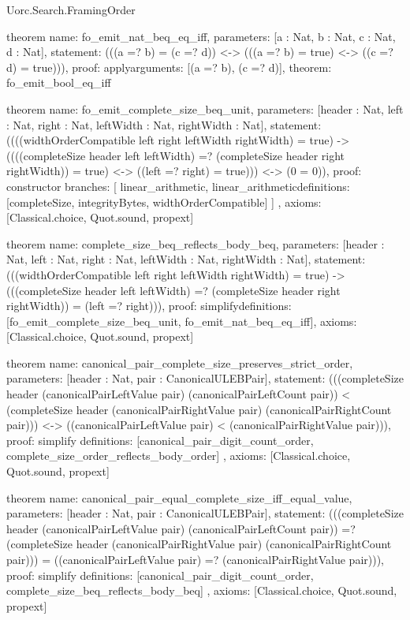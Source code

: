 \begin{lexlean}{Uorc.Search.FramingOrder}
\begin{semanticmodule}
theorem{
  name: fo_emit_nat_beq_eq_iff,
  parameters: [a : Nat, b : Nat, c : Nat, d : Nat],
  statement: (((a =? b) = (c =? d)) <-> (((a =? b) = true) <-> ((c =? d) = true))),
  proof: apply{arguments: [(a =? b), (c =? d)], theorem: fo_emit_bool_eq_iff}
}

theorem{
  name: fo_emit_complete_size_beq_unit,
  parameters: [header : Nat, left : Nat, right : Nat, leftWidth : Nat, rightWidth : Nat],
  statement: ((((widthOrderCompatible left right leftWidth rightWidth) = true) -> ((((completeSize header left leftWidth) =? (completeSize header right rightWidth)) = true) <-> ((left =? right) = true))) <-> (0 = 0)),
  proof: constructor{
    branches: [
      linear_arithmetic{},
      linear_arithmetic{definitions: [completeSize, integrityBytes, widthOrderCompatible]}
    ]
  },
  axioms: [Classical.choice, Quot.sound, propext]
}

theorem{
  name: complete_size_beq_reflects_body_beq,
  parameters: [header : Nat, left : Nat, right : Nat, leftWidth : Nat, rightWidth : Nat],
  statement: (((widthOrderCompatible left right leftWidth rightWidth) = true) -> (((completeSize header left leftWidth) =? (completeSize header right rightWidth)) = (left =? right))),
  proof: simplify{definitions: [fo_emit_complete_size_beq_unit, fo_emit_nat_beq_eq_iff]},
  axioms: [Classical.choice, Quot.sound, propext]
}

theorem{
  name: canonical_pair_complete_size_preserves_strict_order,
  parameters: [header : Nat, pair : CanonicalULEBPair],
  statement: (((completeSize header (canonicalPairLeftValue pair) (canonicalPairLeftCount pair)) < (completeSize header (canonicalPairRightValue pair) (canonicalPairRightCount pair))) <-> ((canonicalPairLeftValue pair) < (canonicalPairRightValue pair))),
  proof: simplify{
    definitions: [canonical_pair_digit_count_order, complete_size_order_reflects_body_order]
  },
  axioms: [Classical.choice, Quot.sound, propext]
}

theorem{
  name: canonical_pair_equal_complete_size_iff_equal_value,
  parameters: [header : Nat, pair : CanonicalULEBPair],
  statement: (((completeSize header (canonicalPairLeftValue pair) (canonicalPairLeftCount pair)) =? (completeSize header (canonicalPairRightValue pair) (canonicalPairRightCount pair))) = ((canonicalPairLeftValue pair) =? (canonicalPairRightValue pair))),
  proof: simplify{
    definitions: [canonical_pair_digit_count_order, complete_size_beq_reflects_body_beq]
  },
  axioms: [Classical.choice, Quot.sound, propext]
}


\end{semanticmodule}
\end{lexlean}
